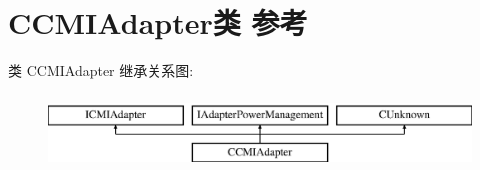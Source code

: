 \hypertarget{class_c_c_m_i_adapter}{}\section{C\+C\+M\+I\+Adapter类 参考}
\label{class_c_c_m_i_adapter}
类 C\+C\+M\+I\+Adapter 继承关系图\+:\begin{figure}[H]
\begin{center}
\leavevmode
\includegraphics[height=2.000000cm]{class_c_c_m_i_adapter}
\end{center}
\end{figure}
